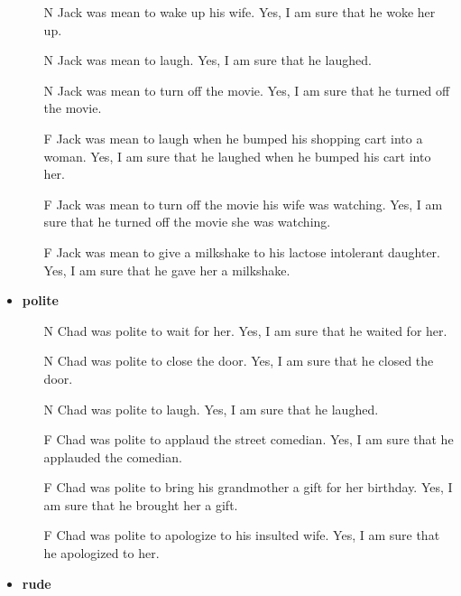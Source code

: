 \documentclass[11pt,fleqn]{article}
\newcommand{\6}{\mbox{$[\hspace*{-.6mm}[$}}
\newcommand{\9}{\mbox{$]\hspace*{-.6mm}]$}}
\begin{document}
\begin{itemize}[itemsep=-1pt]
\begin{enumerate}[topsep=0pt,itemsep=-4pt]

\item[N]  	Jack was mean to wake up his wife.	Yes, I am sure that he woke her up.
\item[N]  	Jack was mean to laugh.	Yes, I am sure that he laughed.
\item[N]  	Jack was mean to turn off the movie.	Yes, I am sure that he turned off the movie.
\item[F]  	Jack was mean to laugh when he bumped his shopping cart into a woman.	Yes, I am sure that he laughed when he bumped his cart into her.
\item[F]  	Jack was mean to turn off the movie his wife was watching.	Yes, I am sure that he turned off the movie she was watching.
\item[F]  	Jack was mean to give a milkshake to his lactose intolerant daughter.	Yes, I am sure that he gave her a milkshake.

\end{enumerate}

\item {\bf polite}

\begin{enumerate}[topsep=0pt,itemsep=-4pt]

\item[N]  	Chad was polite to wait for her.	Yes, I am sure that he waited for her.
\item[N]  	Chad was polite to close the door.	Yes, I am sure that he closed the door.
\item[N]  	Chad was polite to laugh.	Yes, I am sure that he laughed.
\item[F]  	Chad was polite to applaud the street comedian.	Yes, I am sure that he applauded the comedian.
\item[F]  	Chad was polite to bring his grandmother a gift for her birthday.	Yes, I am sure that he brought her a gift.
\item[F]  	Chad was polite to apologize to his insulted wife.	Yes, I am sure that he apologized to her.

\end{enumerate}

\item {\bf rude}

\begin{enumerate}[topsep=0pt,itemsep=-4pt]


\end{enumerate}
\end{itemize}
\end{document}
